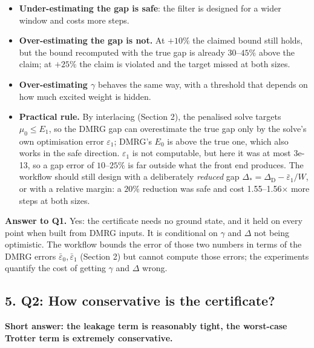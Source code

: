\documentclass[
]{article}
\providecommand{\tightlist}{%
  \setlength{\itemsep}{0pt}\setlength{\parskip}{0pt}}
\begin{document}
\begin{itemize}
\tightlist
\item
  \textbf{Under-estimating the gap is safe}: the filter is designed for
  a wider window and costs more steps.
\item
  \textbf{Over-estimating the gap is not.} At \(+10\%\) the claimed
  bound still holds, but the bound recomputed with the true gap is
  already \(30\)--\(45\%\) above the claim; at \(+25\%\) the claim is
  violated and the target missed at both sizes.
\item
  \textbf{Over-estimating \(\gamma\)} behaves the same way, with a
  threshold that depends on how much excited weight is hidden.
\item
  \textbf{Practical rule.} By interlacing (Section 2), the penalised
  solve targets \(\mu_0\le E_1\), so the DMRG gap can overestimate the
  true gap only by the solve's own optimisation error \(\varepsilon_1\);
  DMRG's \(E_0\) is above the true one, which also works in the safe
  direction. \(\varepsilon_1\) is not computable, but here it was at
  most 3e-13, so a gap error of \(10\)--\(25\%\) is far outside what the
  front end produces. The workflow should still design with a
  deliberately \emph{reduced} gap
  \(\Delta_*=\Delta_{\mathrm{D}}-\bar\varepsilon_1/W\), or with a
  relative margin: a \(20\%\) reduction was safe and cost
  1.55--1.56\(\times\) more steps at both sizes.
\end{itemize}

\textbf{Answer to Q1.} Yes: the certificate needs no ground state, and
it held on every point when built from DMRG inputs. It is conditional on
\(\gamma\) and \(\Delta\) not being optimistic. The workflow bounds the
error of those two numbers in terms of the DMRG errors
\(\bar\varepsilon_0,\bar\varepsilon_1\) (Section 2) but cannot compute
those errors; the experiments quantify the cost of getting \(\gamma\)
and \(\Delta\) wrong.

\hypertarget{q2-how-conservative-is-the-certificate}{%
\subsection{5. Q2: How conservative is the
certificate?}\label{q2-how-conservative-is-the-certificate}}

\textbf{Short answer: the leakage term is reasonably tight, the
worst-case Trotter term is extremely conservative.}
\end{document}
